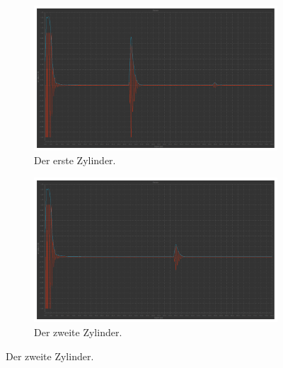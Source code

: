 \begin{figure}%
  \begin{subfigure}{0.48\textwidth}%
  \centering%
  \includegraphics[width=\linewidth]{pictures/Impuls-Echo-Zylinder/z1.pdf}%
  \caption{Der erste Zylinder.}%
  \label{fig:echo_z1}%
  \end{subfigure}%
  \hfill%
  \begin{subfigure}{0.48\textwidth}%
  \centering%
  \includegraphics[width=\linewidth]{pictures/Impuls-Echo-Zylinder/z2.pdf}%
  \caption{Der zweite Zylinder.}%
  \label{fig:echo_z2}%
  \end{subfigure}%
  \hfill


\end{figure}
